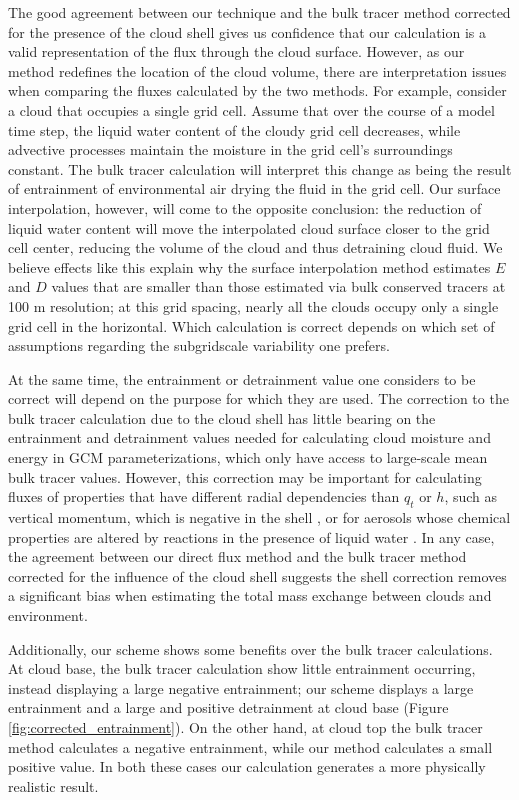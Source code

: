 \documentclass[12pt]{article}
\begin{document}
The good agreement between our technique and the bulk tracer method corrected 
for the presence of the cloud shell gives us confidence that our calculation is 
a valid representation of the flux through the cloud surface.  However, as our 
method redefines the location of the cloud volume, there are interpretation 
issues when comparing the fluxes calculated by the two methods.  For example, 
consider a cloud that occupies a single grid cell.  Assume that over the course 
of a model time step, the liquid water content of the cloudy grid cell 
decreases, while advective processes maintain the moisture in the grid cell's 
surroundings constant.  The bulk tracer calculation will interpret this change 
as being the result of entrainment of environmental air drying the fluid in the 
grid cell.  Our surface interpolation, however, will come to the opposite 
conclusion: the reduction of liquid water content will move the interpolated 
cloud surface closer to the grid cell center, reducing the volume of the cloud 
and thus detraining cloud fluid.  We believe effects like this explain why the 
surface interpolation method estimates $E$ and $D$ values that are smaller than 
those estimated via bulk conserved tracers at 100 m resolution; at this grid 
spacing, nearly all the clouds occupy only a single grid cell in the horizontal.
Which calculation is correct depends on which set of assumptions regarding the 
subgridscale variability one prefers.  

At the same time, the entrainment or detrainment value one considers to be 
correct will depend on the purpose for which they are used.  The correction to 
the bulk tracer calculation due to the cloud shell has little bearing on the 
entrainment and detrainment values needed for calculating cloud moisture and 
energy in GCM parameterizations, which only have access to large-scale mean 
bulk tracer values.  However, this correction may be important for calculating 
fluxes of properties that have different radial dependencies than $q_t$ or $h$, 
such as vertical momentum, which is negative in the shell \citep{Heus2008}, or 
for aerosols whose chemical properties are altered by reactions in the presence 
of liquid water \citep{Hoppel1994}.  In any case, the agreement between our 
direct flux method and the bulk tracer method corrected for the influence of 
the cloud shell suggests the shell correction removes a significant bias when 
estimating the total mass exchange between clouds and environment.

Additionally, our scheme shows some benefits over the bulk tracer calculations. 
At cloud base, the bulk tracer calculation show little entrainment occurring, 
instead displaying a large negative entrainment; our scheme displays a large 
entrainment and a large and positive detrainment at cloud base (Figure 
\ref{fig:corrected_entrainment}).  On the other hand, at cloud top the bulk 
tracer method calculates a negative entrainment, while our method calculates a 
small positive value.  In both these cases our calculation generates a more 
physically realistic result.  
\end{document}
